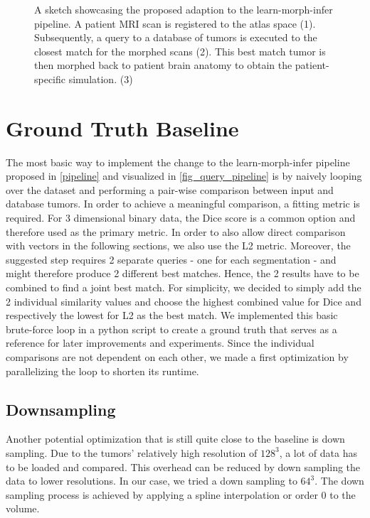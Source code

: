\begin{figure}[htbp]
  \centering
  
  \caption{A sketch showcasing the proposed adaption to the learn-morph-infer pipeline. A patient MRI scan is registered to the atlas space (1). Subsequently, a query to a database of tumors is executed to the closest match for the morphed scans (2). This best match tumor is then morphed back to patient brain anatomy to obtain the patient-specific simulation. (3)}\label{fig_query_pipeline}
\end{figure}

\FloatBarrier
\section{Ground Truth Baseline}
The most basic way to implement the change to the learn-morph-infer pipeline proposed in \autoref{pipeline} and visualized in \autoref{fig_query_pipeline} is by naively looping over the dataset and performing a pair-wise comparison between input and database tumors. In order to achieve a meaningful comparison, a fitting metric is required.
For 3 dimensional binary data, the Dice score is a common option  and therefore used as the primary metric. In order to also allow direct comparison with vectors in the following sections, we also use the L2 metric.
Moreover, the suggested step requires 2 separate queries - one for each segmentation - and might therefore produce 2 different best matches. Hence, the 2 results have to be combined to find a joint best match. For simplicity, we decided to simply add the 2 individual similarity values and choose the highest combined value for Dice and respectively the lowest for L2 as the best match. 
We implemented this basic brute-force loop in a python script to create a ground truth that serves as a reference for later improvements and experiments.
Since the individual comparisons are not dependent on each other, we made a first optimization by parallelizing the loop to shorten its runtime.

\subsection{Downsampling}
Another potential optimization that is still quite close to the baseline is down sampling. Due to the tumors' relatively high resolution of $128^3$, a lot of data has to be loaded and compared. This overhead can be reduced by down sampling the data to lower resolutions. In our case, we tried a down sampling to $64^3$.  The down sampling process is achieved by applying a spline interpolation or order 0 to the volume. 


